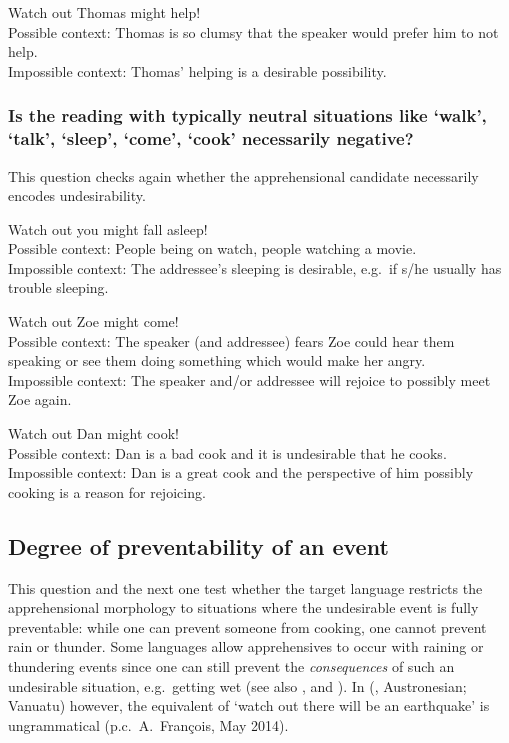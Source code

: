\documentclass[output=paper,colorlinks,citecolor=brown]{langscibook}
\begin{document}
\ea \label{p5} {\op}Watch out{\cp} Thomas might help! \\
\textnormal{Possible context: Thomas is so clumsy that the speaker would prefer him to not help.} \\
\textnormal{Impossible context: Thomas' helping is a desirable possibility.}
\z


\subsubsection{Is the reading with \textbf{typically neutral situations} like `walk', `talk', `sleep', `come', `cook' necessarily negative?}

This question checks again whether the apprehensional candidate necessarily encodes undesirability.
\label{1.1.3}

\ea \label{p6} {\op}Watch out{\cp} you might fall asleep!\\
\textnormal{Possible context: People being on watch, people watching a movie. }\\
\textnormal{Impossible context: The addressee's sleeping is desirable, e.g.\ if s/he usually has trouble sleeping.}
\z

\ea \label{p7} {\op}Watch out{\cp} Zoe might come! \\
\textnormal{Possible context: The speaker (and addressee) fears Zoe could hear them speaking or see them doing something which would make her angry.} \\
\textnormal{Impossible context: The speaker and/or addressee will rejoice to possibly meet Zoe again.}
\z

\ea \label{p8} {\op}Watch out{\cp} Dan might cook! \\
\textnormal{Possible context: Dan is a bad cook and it is undesirable that he cooks.} \\
\textnormal{Impossible context: Dan is a great cook and the perspective of him possibly cooking is a reason for rejoicing.}
\z

\subsection{Degree of preventability of an event}
\label{subsec:apprpreventability}

This question and the next one test whether the target language restricts the apprehensional morphology to situations where the undesirable event is fully preventable: while one can prevent someone from cooking, one cannot prevent rain or thunder. Some languages allow apprehensives to occur with raining or thundering events since one can still prevent the \textit{consequences} of such an undesirable situation, e.g.\ getting wet (see also \cite[274]{vuillermet2018a}, and \cite{chapters/fedotov}). In  (, Austronesian; Vanuatu) however, the equivalent of ‘watch out there will be an earthquake' is ungrammatical (p.c.\ A.\ François, May 2014).
\end{document}
